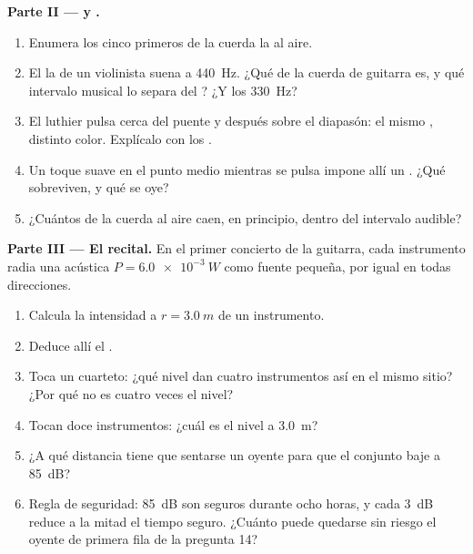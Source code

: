 \begin{problem}
\medskip
\noindent\textbf{Parte II ---  y .}
\begin{enumerate}[resume]
  \item Enumera los cinco primeros  de la cuerda la al aire.
  \item El la de un violinista suena a \qty{440}{Hz}. ¿Qué  de
        la cuerda de guitarra es, y qué intervalo musical lo separa del
        ? ¿Y los \qty{330}{Hz}?
  \item El luthier pulsa cerca del puente y después sobre el diapasón:
        el mismo , distinto color. Explícalo con los .
  \item Un toque suave en el punto medio mientras se pulsa impone allí
        un . ¿Qué  sobreviven, y qué  se oye?
  \item ¿Cuántos  de la cuerda al aire caen, en principio,
        dentro del intervalo audible?
\end{enumerate}

\medskip
\noindent\textbf{Parte III --- El recital.}
En el primer concierto de la guitarra, cada instrumento radia una
 acústica $P = \qty{6.0e-3}{W}$ como fuente pequeña, por igual
en todas direcciones.
\begin{enumerate}[resume]
  \item Calcula la intensidad a $r = \qty{3.0}{m}$ de un instrumento.
  \item Deduce allí el .
  \item Toca un cuarteto: ¿qué nivel dan cuatro instrumentos así en el
        mismo sitio? ¿Por qué no es cuatro veces el nivel?
  \item Tocan doce instrumentos: ¿cuál es el nivel a \qty{3.0}{m}?
  \item ¿A qué distancia tiene que sentarse un oyente para que el
        conjunto baje a \qty{85}{dB}?
  \item Regla de seguridad: \qty{85}{dB} son seguros durante ocho horas,
        y cada \qty{+3}{dB} reduce a la mitad el tiempo seguro. ¿Cuánto
        puede quedarse sin riesgo el oyente de primera fila de la
        pregunta 14?
\end{enumerate}


\end{problem}
